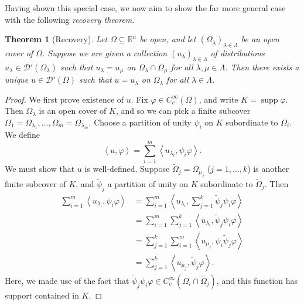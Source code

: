 \documentclass{book}
\newcommand{\scrD}{\mathscr{D}}
\newcommand{\bbR}{\mathbb{R}}
\renewcommand{\phi}{\varphi}
\newcommand{\angles}[1]{\left\langle {#1} \right\rangle}
\DeclareMathOperator{\supp}{supp}
\newtheorem{theorem}{Theorem}[chapter]
\theoremstyle{definition}
\theoremstyle{remark}
\numberwithin{equation}{chapter}
\begin{document}
Having shown this special case, we now aim to show the far more general case with the following \textit{recovery theorem}.
\begin{theorem}[Recovery] \label{thm:recoveringDistributions}
    Let $\Omega \subseteq \bbR^n$ be open, and let $(\Omega_\lambda)_{\lambda \in \Lambda}$ be an open cover of $\Omega$. Suppose we are given a collection $(u_\lambda)_{\lambda \in \Lambda}$ of distributions $u_\lambda \in \scrD'(\Omega_\lambda)$ such that $u_\lambda = u_\mu$ on $\Omega_\lambda \cap \Omega_\mu$ for all $\lambda,\mu \in \Lambda$. Then there exists a unique $u \in \scrD'(\Omega)$ such that $u = u_\lambda$ on $\Omega_\lambda$ for all $\lambda \in \Lambda$.
\end{theorem}
\begin{proof}
    We first prove existence of $u$. Fix $\phi \in C_c^\infty(\Omega)$, and write $K = \supp{\phi}$. Then $\Omega_\lambda$ is an open cover of $K$, and so we can pick a finite subcover $\Omega_1 = \Omega_{\lambda_1},\dots,\Omega_m = \Omega_{\lambda_m}$. Choose a partition of unity $\psi_i$ on $K$ subordinate to $\Omega_i$. We define 
    \begin{equation} \label{eq:recoveringADistributionFromACover}
        \angles{ u,\phi } = \sum_{i=1}^m \angles{ u_{\lambda_i},\psi_i \phi }.
    \end{equation}
    We must show that $u$ is well-defined. Suppose $\widetilde{\Omega}_j = \Omega_{\mu_j}$ ($j=1,\dots,k$) is another finite subcover of $K$, and $\widetilde{\psi}_j$ a partition of unity on $K$ subordinate to $\widetilde{\Omega}_j$. Then 
    \begin{equation} \begin{aligned}
        \sum_{i=1}^m \angles{ u_{\lambda_i},\psi_i \phi } &= \sum_{i=1}^m \angles{ u_{\lambda_i},\sum_{j=1}^k \widetilde{\psi}_j \psi_i \phi } \\
                                                           &= \sum_{i=1}^m \sum_{j=1}^k \angles{ u_{\lambda_i}, \widetilde{\psi}_j \psi_i \phi} \\
                                                           &= \sum_{j=1}^k \sum_{i=1}^m \angles{ u_{\mu_j}, \psi_i \widetilde{\psi}_j \phi}      \\
                                                           &= \sum_{j=1}^k \angles{ u_{\mu_j}, \widetilde{\psi}_j \phi }.
    \end{aligned} \end{equation}
    Here, we made use of the fact that $\widetilde{\psi}_j \psi_i \phi \in C_c^\infty(\Omega_i \cap \widetilde{\Omega}_j)$, and this function has support contained in $K$.


\end{proof}
\end{document}
